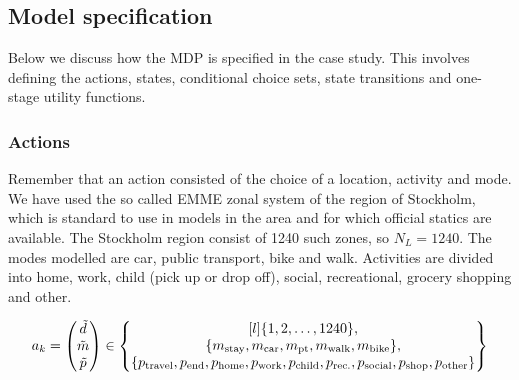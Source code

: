 \subsection{Model specification}
Below we discuss how the MDP is specified in the case study. This involves defining the actions, states, conditional choice sets, state transitions and one-stage utility functions.  
\subsubsection{Actions}
Remember that an action consisted of the choice of a location, activity and mode. We have used the so called EMME zonal system of the region of Stockholm, which is standard to use in models in the area and for which official statics are available. The Stockholm region consist of 1240 such zones, so $N_L = 1240$. The modes modelled are car, public transport, bike and walk. Activities are divided into home, work, child (pick up or drop off), social, recreational, grocery shopping and other.

\begin{equation} 
a_k = \begin{pmatrix}
\act{d} \\
\act{m} \\
\act{p}    
\end{pmatrix}
\in
\begin{Bmatrix*}[l]
\{1,2,\dots, 1240\}, \\
\{m_{\text{stay}},\m{car},\m{pt},\m{walk},\m{bike}\}, \\
\{ p_{\text{travel}},p_{\text{end}},\p{home},\p{work},\p{child},\p{rec.},\p{social},\p{shop},\p{other}\} 
\end{Bmatrix*}
\end{equation}
